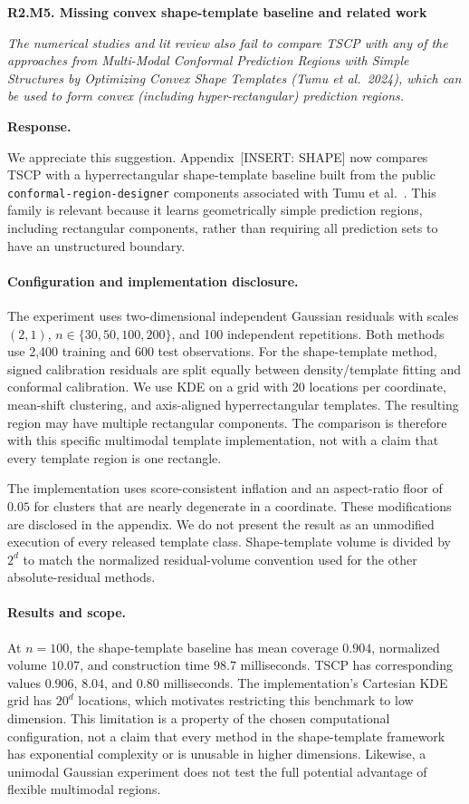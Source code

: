 \documentclass[11pt]{article}
\numberwithin{equation}{section}
\newcommand{\pending}[1]{\textcolor{AuthorRed}{[INSERT: #1]}}
\newcommand{\reviewercomment}[2]{%
  \par\medskip\noindent\textbf{#1}\par\nopagebreak
  \begingroup\color{ReviewerBlue}\itshape #2\par\endgroup
  \noindent\textbf{Response.} }
\newcommand{\AppShape}{Appendix~\pending{SHAPE}} %
\begin{document}
\reviewercomment{R2.M5. Missing convex shape-template baseline and related work}{%
The numerical studies and lit review also fail to compare TSCP with
any of the approaches from Multi-Modal Conformal Prediction Regions
with Simple Structures by Optimizing Convex Shape Templates
(Tumu et al.\ 2024), which can be used to form convex (including
hyper-rectangular) prediction regions.}

We appreciate this suggestion. \AppShape{} now compares TSCP with
a hyperrectangular shape-template baseline built from the public
\texttt{conformal-region-designer} components associated with
Tumu et al.\ \cite{tumu2024}. This family is relevant because it
learns geometrically simple prediction regions, including rectangular
components, rather than requiring all prediction sets to have an
unstructured boundary.

\paragraph{Configuration and implementation disclosure.}
The experiment uses two-dimensional independent Gaussian residuals
with scales $(2,1)$, $n\in\{30,50,100,200\}$, and 100 independent
repetitions. Both methods use 2,400 training and 600 test observations.
For the shape-template method, signed calibration residuals are split
equally between density/template fitting and conformal calibration.
We use KDE on a grid with 20 locations per coordinate, mean-shift
clustering, and axis-aligned hyperrectangular templates. The resulting
region may have multiple rectangular components. The comparison is
therefore with this specific multimodal template implementation, not
with a claim that every template region is one rectangle.

The implementation uses score-consistent inflation and an aspect-ratio
floor of $0.05$ for clusters that are nearly degenerate in a
coordinate. These modifications are disclosed in the appendix. We
do not present the result as an unmodified execution of every
released template class. Shape-template volume is divided by $2^d$
to match the normalized residual-volume convention used for the
other absolute-residual methods.

\paragraph{Results and scope.}
At $n=100$, the shape-template baseline has mean coverage $0.904$,
normalized volume $10.07$, and construction time $98.7$ milliseconds.
TSCP has corresponding values $0.906$, $8.04$, and $0.80$
milliseconds. The implementation's Cartesian KDE grid has $20^d$
locations, which motivates restricting this benchmark to low
dimension. This limitation is a property of the chosen computational
configuration, not a claim that every method in the shape-template
framework has exponential complexity or is unusable in higher
dimensions. Likewise, a unimodal Gaussian experiment does not test
the full potential advantage of flexible multimodal regions.
\end{document}
